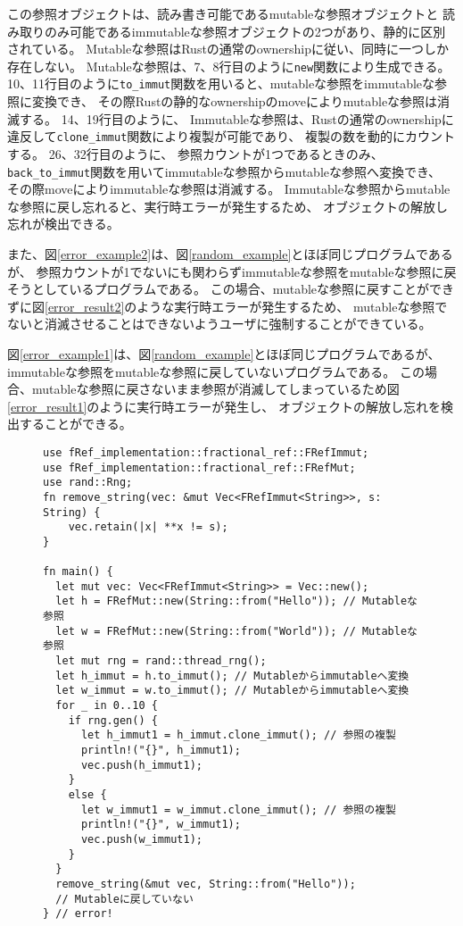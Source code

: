 \documentclass{sumiilab-paper}
\theoremstyle{mystyle}
\numberwithin{definition}{chapter} %
\begin{document}
この参照オブジェクトは、読み書き可能であるmutableな参照オブジェクトと
読み取りのみ可能であるimmutableな参照オブジェクトの2つがあり、静的に区別されている。
Mutableな参照はRustの通常のownershipに従い、同時に一つしか存在しない。
Mutableな参照は、7、8行目のように\texttt{new}関数により生成できる。
10、11行目のように\texttt{to\_immut}関数を用いると、mutableな参照をimmutableな参照に変換でき、
その際Rustの静的なownershipのmoveによりmutableな参照は消滅する。
14、19行目のように、
Immutableな参照は、Rustの通常のownershipに違反して\texttt{clone\_immut}関数により複製が可能であり、
複製の数を動的にカウントする。
26、32行目のように、
参照カウントが1つであるときのみ、
\texttt{back\_to\_immut}関数を用いてimmutableな参照からmutableな参照へ変換でき、
その際moveによりimmutableな参照は消滅する。
Immutableな参照からmutableな参照に戻し忘れると、実行時エラーが発生するため、
オブジェクトの解放し忘れが検出できる。

また、図\ref{error_example2}は、図\ref{random_example}とほぼ同じプログラムであるが、
参照カウントが1でないにも関わらずimmutableな参照をmutableな参照に戻そうとしているプログラムである。
この場合、mutableな参照に戻すことができずに図\ref{error_result2}のような実行時エラーが発生するため、
mutableな参照でないと消滅させることはできないようユーザに強制することができている。

図\ref{error_example1}は、図\ref{random_example}とほぼ同じプログラムであるが、
immutableな参照をmutableな参照に戻していないプログラムである。
この場合、mutableな参照に戻さないまま参照が消滅してしまっているため図\ref{error_result1}のように実行時エラーが発生し、
オブジェクトの解放し忘れを検出することができる。

\begin{figure}[htp]
\begin{lstlisting}[caption=オブジェクトの解放し忘れを検出する例, 
  label=error_example1, captionpos=b]
use fRef_implementation::fractional_ref::FRefImmut;
use fRef_implementation::fractional_ref::FRefMut;
use rand::Rng;
fn remove_string(vec: &mut Vec<FRefImmut<String>>, s: String) {
    vec.retain(|x| **x != s);
}

fn main() {
  let mut vec: Vec<FRefImmut<String>> = Vec::new();
  let h = FRefMut::new(String::from("Hello")); // Mutableな参照
  let w = FRefMut::new(String::from("World")); // Mutableな参照
  let mut rng = rand::thread_rng();
  let h_immut = h.to_immut(); // Mutableからimmutableへ変換
  let w_immut = w.to_immut(); // Mutableからimmutableへ変換
  for _ in 0..10 {
    if rng.gen() {
      let h_immut1 = h_immut.clone_immut(); // 参照の複製
      println!("{}", h_immut1);
      vec.push(h_immut1);
    }
    else {
      let w_immut1 = w_immut.clone_immut(); // 参照の複製
      println!("{}", w_immut1);
      vec.push(w_immut1);
    }
  }
  remove_string(&mut vec, String::from("Hello"));
  // Mutableに戻していない
} // error!
\end{lstlisting}
\end{figure}
\end{document}

